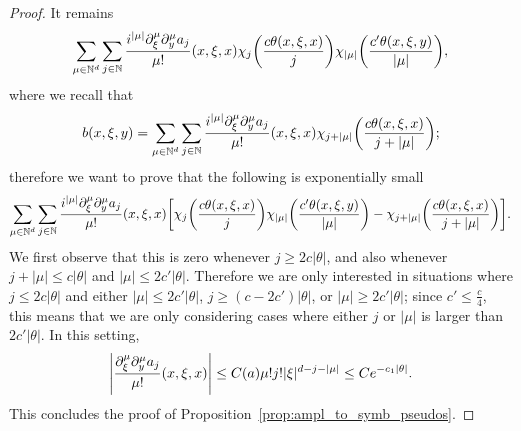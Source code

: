 \documentclass[AHL,Unicode,longabstracts,published]{cedram}
\newcommand\1{\mathds{1}}
\newcommand{\N}{\mathbb{N}}
\let\originalleft\left
\let\originalright\right
\renewcommand{\left}{\mathopen{}\mathclose\bgroup\originalleft}
\renewcommand{\right}{\aftergroup\egroup\originalright}
\begin{document}
\begin{proof}
It remains
\[
\sum_{\mu\in \N^d}\sum_{j\in
\N}\frac{i^{|\mu|}\partial_{\xi}^{\mu}\partial_y^{\mu}a_j}{\mu!}(x,\xi,x)\chi_j\left(\frac{c\theta(x,\xi,x)}{j}\right)\chi_{|\mu|}\left(\frac{c'\theta(x,\xi,y)}{|\mu|}\right),
\]
where we recall that
\[
b(x,\xi,y)=\sum_{\mu\in \N^d}\sum_{j\in
\N}\frac{i^{|\mu|}\partial_{\xi}^{\mu}\partial_y^{\mu}a_j}{\mu!}(x,\xi,x)\chi_{j+|\mu|}\left(\frac{c\theta(x,\xi,x)}{j+|\mu|}\right);
\]
therefore we want to prove that the following is exponentially small
\[
\sum_{\mu\in \N^d}\sum_{j\in
\N}\frac{i^{|\mu|}\partial_{\xi}^{\mu}\partial_y^{\mu}a_j}{\mu!}(x,\xi,x)\left[\chi_j\left(\frac{c\theta(x,\xi,x)}{j}\right)
\chi_{|\mu|}\left(\frac{c'\theta(x,\xi,y)}{|\mu|}\right)-\chi_{j+|\mu|}\left(\frac{c\theta(x,\xi,x)}{j+|\mu|}\right)\right].
\]
We first observe that this is zero whenever $j\geq 2c|\theta|$, and also whenever $j+|\mu|\leq c|\theta|$ and $|\mu|\leq 2c'|\theta|$. Therefore we are only interested in situations where $j\leq 2c|\theta|$ and either $|\mu|\leq 2c'|\theta|$, $j\geq (c-2c')|\theta|$, or $|\mu|\geq 2c'|\theta|$; since $c'\leq \frac c4$, this means that we are only considering cases where either $j$ or $|\mu|$ is larger than $2c'|\theta|$. In this setting,
\[
\left|\frac{\partial_{\xi}^{\mu}\partial_y^{\mu}a_j}{\mu!}(x,\xi,x)\right|\leq C(a)\mu!j!|\xi|^{d-j-|\mu|}\leq Ce^{-c_1|\theta|}.
\]
This concludes the proof of Proposition~\ref{prop:ampl_to_symb_pseudos}.
\end{proof}
\end{document}
